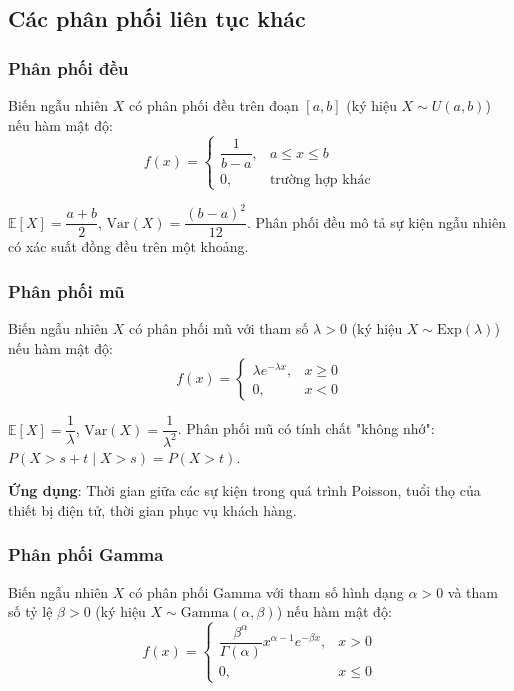 \subsection{Các phân phối liên tục khác}

\subsubsection*{Phân phối đều}
\begin{dn}
Biến ngẫu nhiên $X$ có phân phối đều trên đoạn $[a,b]$ (ký hiệu $X\sim U(a,b)$) nếu hàm mật độ:
\[
f(x)=\begin{cases}
\dfrac{1}{b-a}, & a \leq x \leq b \\
0, & \text{trường hợp khác}
\end{cases}
\]
\end{dn}

\begin{tinhchat}
$\mathbb{E}[X]=\dfrac{a+b}{2}$, $\text{Var}(X)=\dfrac{(b-a)^2}{12}$. Phân phối đều mô tả sự kiện ngẫu nhiên có xác suất đồng đều trên một khoảng.
\end{tinhchat}

\subsubsection*{Phân phối mũ}
\begin{dn}
Biến ngẫu nhiên $X$ có phân phối mũ với tham số $\lambda>0$ (ký hiệu $X\sim\text{Exp}(\lambda)$) nếu hàm mật độ:
\[
f(x)=\begin{cases}
\lambda e^{-\lambda x}, & x \geq 0 \\
0, & x < 0
\end{cases}
\]
\end{dn}

\begin{tinhchat}
$\mathbb{E}[X]=\dfrac{1}{\lambda}$, $\text{Var}(X)=\dfrac{1}{\lambda^2}$. Phân phối mũ có tính chất "không nhớ": $P(X > s+t \mid X > s) = P(X > t)$.

\textbf{Ứng dụng}: Thời gian giữa các sự kiện trong quá trình Poisson, tuổi thọ của thiết bị điện tử, thời gian phục vụ khách hàng.
\end{tinhchat}

\subsubsection*{Phân phối Gamma}
\begin{dn}
Biến ngẫu nhiên $X$ có phân phối Gamma với tham số hình dạng $\alpha>0$ và tham số tỷ lệ $\beta>0$ (ký hiệu $X\sim\text{Gamma}(\alpha,\beta)$) nếu hàm mật độ:
\[
f(x)=\begin{cases}
\dfrac{\beta^\alpha}{\Gamma(\alpha)}x^{\alpha-1}e^{-\beta x}, & x > 0 \\
0, & x \leq 0
\end{cases}
\]
\end{dn}

